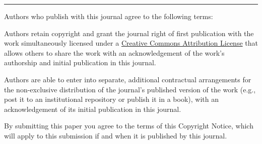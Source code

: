 \vspace{10pt}
\hrule
\vspace{10pt}


Authors who publish with this journal agree to the following terms:

Authors retain copyright and grant the journal right of first publication with
the work simultaneously licensed under a
\href{http://creativecommons.org/licenses/by/3.0/}{Creative Commons Attribution
License} that allows others to share the work with an acknowledgement of the
work's authorship and initial publication in this journal.

Authors are able to enter into separate, additional contractual arrangements
for the non-exclusive distribution of the journal's published version of the
work (e.g., post it to an institutional repository or publish it in a book),
with an acknowledgement of its initial publication in this journal.

By submitting this paper you agree to the terms of this Copyright Notice, which
will apply to this submission if and when it is published by this journal.

